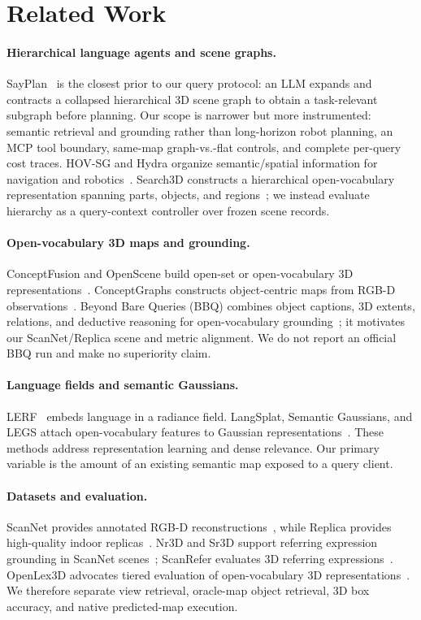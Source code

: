 \documentclass[10pt,twocolumn,letterpaper]{article}
\begin{document}
\section{Related Work}
\paragraph{Hierarchical language agents and scene graphs.}
SayPlan~\cite{rana2023sayplan} is the closest prior to our query protocol: an
LLM expands and contracts a collapsed hierarchical 3D scene graph to obtain a
task-relevant subgraph before planning. Our scope is narrower but more
instrumented: semantic retrieval and grounding rather than long-horizon robot
planning, an MCP tool boundary, same-map graph-vs.-flat controls, and complete
per-query cost traces. HOV-SG and Hydra organize semantic/spatial information
for navigation and robotics~\cite{hovsg2024,hydra2022}. Search3D constructs a
hierarchical open-vocabulary representation spanning parts, objects, and
regions~\cite{takmaz2025search3d}; we instead evaluate hierarchy as a
query-context controller over frozen scene records.

\paragraph{Open-vocabulary 3D maps and grounding.}
ConceptFusion and OpenScene build open-set or open-vocabulary 3D
representations~\cite{conceptfusion2023,openscene2023}. ConceptGraphs constructs
object-centric maps from RGB-D observations~\cite{gu2023conceptgraphs}. Beyond
Bare Queries (BBQ) combines object captions, 3D extents, relations, and
deductive reasoning for open-vocabulary grounding~\cite{bbq2024}; it motivates
our ScanNet/Replica scene and metric alignment. We do not report an official
BBQ run and make no superiority claim.

\paragraph{Language fields and semantic Gaussians.}
LERF~\cite{kerr2023lerf} embeds language in a radiance field. LangSplat,
Semantic Gaussians, and LEGS attach open-vocabulary features to Gaussian
representations~\cite{langsplat2024,semanticgaussians2024,legs2024}. These
methods address representation learning and dense relevance. Our primary
variable is the amount of an existing semantic map exposed to a query client.

\paragraph{Datasets and evaluation.}
ScanNet provides annotated RGB-D reconstructions~\cite{dai2017scannet}, while
Replica provides high-quality indoor replicas~\cite{straub2019replica}. Nr3D
and Sr3D support referring expression grounding in ScanNet
scenes~\cite{achlioptas2020referit3d}; ScanRefer evaluates 3D referring
expressions~\cite{scanrefer2020}. OpenLex3D advocates tiered evaluation of
open-vocabulary 3D representations~\cite{openlex3d2025}. We therefore separate
view retrieval, oracle-map object retrieval, 3D box accuracy, and native
predicted-map execution.
\end{document}
